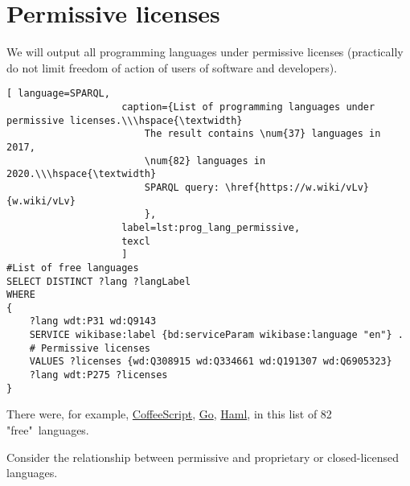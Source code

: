 \section{Permissive licenses}
We will output all programming languages under permissive licenses (practically do not limit freedom of action of users of software and developers).

\begin{lstlisting}[ language=SPARQL, 
                    caption={List of programming languages under permissive licenses.\\\hspace{\textwidth}
                        The result contains \num{37} languages in 2017, 
                        \num{82} languages in 2020.\\\hspace{\textwidth}
                        SPARQL query: \href{https://w.wiki/vLv}{w.wiki/vLv}
                        },
                    label=lst:prog_lang_permissive,
                    texcl 
                    ]
#List of free languages
SELECT DISTINCT ?lang ?langLabel
WHERE
{
    ?lang wdt:P31 wd:Q9143
    SERVICE wikibase:label {bd:serviceParam wikibase:language "en"} .
    # Permissive licenses
    VALUES ?licenses {wd:Q308915 wd:Q334661 wd:Q191307 wd:Q6905323}
    ?lang wdt:P275 ?licenses
}
\end{lstlisting}%

There were, for example, \href{https://en.wikipedia.org/wiki/CoffeeScript}{CoffeeScript}, \href{https://en.wikipedia.org/wiki/Go}{Go}, \href{https://en.wikipedia.org/wiki/Haml}{Haml}, in this list of 82 "free"\  languages.

Consider the relationship between permissive and proprietary or closed-licensed languages.


